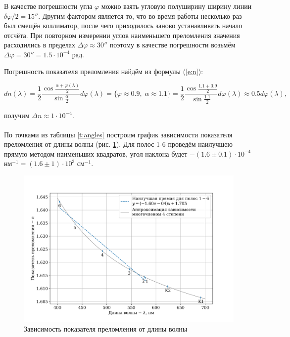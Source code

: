 \documentclass[a4paper,12pt]{article} %
\begin{document}
В качестве погрешности угла $\varphi$ можно взять угловую полуширину ширину линии $\delta \varphi / 2 = 15''$. Другим фактором является то, что во время работы несколько раз был смещён коллиматор, после чего приходилось заново устанавливать начало отсчёта. При повторном измерении углов наименьшего преломления значения расходились в пределах $\Delta \varphi \approx 30''$ поэтому в качестве погрешности возьмём $\Delta \varphi = 30'' = 1.5 \cdot 10^{-4}$ рад.

Погрешность показателя преломления найдём из формулы (\ref{e:n}):

\[
dn(\lambda) = \frac{1}{2}\frac{\cos{\frac{\alpha + \varphi(\lambda)}{2}}}{\sin{\frac{\alpha}{2}}} d \varphi(\lambda) = \lbrace \varphi \approx 0.9, \; \alpha \approx 1.1 \rbrace = \frac{1}{2} \frac{\cos{\frac{1.1 + 0.9}{2}}}{\sin{\frac{1.1}{2}}} d \varphi(\lambda) \approx 0.5 d\varphi(\lambda),
\]

\noindent получим $\Delta n \approx 1 \cdot 10^{-4}$.

\paragraph{} По точками из таблицы \ref{t:angles} построим график зависимости показателя преломления от длины волны (рис. \ref{fig:plot}). Для полос 1-6 проведём наилучшею прямую методом наименьших квадратов, угол наклона будет $- (1.6 \pm 0.1) \cdot 10^{-4}$ нм$^{-1} = (1.6 \pm 1) \cdot 10^{3}$ см$^{-1}$.

\begin{figure}[h]
\center
\includegraphics[width=\textwidth]{plot1.png}
\caption{Зависимость показателя преломления от длины волны}
\label{fig:plot}
\end{figure}
\end{document}

